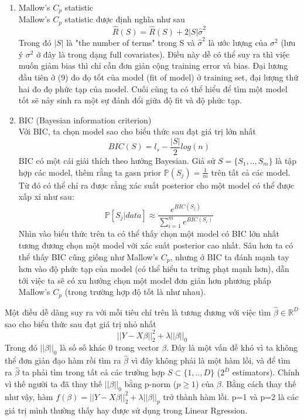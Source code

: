 \documentclass[10pt]{article}
\begin{document}
\begin{enumerate}
\item Mallow's $C_p$ statistic\\
Mallow's $C_p$ statistic được định nghĩa như sau 
\[\hat{R}(S) = \hat{R}(S) + 2|S|\hat{\sigma}^2 \tag{9} \]
Trong đó $|S|$ là "the number of terms" trong S và $\hat{\sigma}^2$ là ước lượng của $\sigma^2$ (lưu ý $\sigma^2$ ở đây là trong dạng full covariates). Điều này dễ có thể suy ra thì việc muốn giảm bias thì chỉ cần đơn giản cộng training error và bias. Đại lương đầu tiên ở (9) đo đọ tốt của model (fit of model) ở training set, đại lượng thứ hai đo đọ phức tạp của model. Cuối cùng ta có thể hiểu để tìm một model tốt sẽ nảy sinh ra một sự đánh đổi giữa độ fit và độ phức tạp.
\item BIC (Bayesian information criterion)\\
Với BIC, ta chọn model sao cho biểu thức sau đạt giá trị lớn nhất
\[BIC(S) = l_s -\frac{|S|}{2}log(n) \]
BIC có một cái giải thích theo hướng Bayesian. Giả sử $S = \{S_1,..,S_m \}$ là tập hợp các model, thêm rằng ta gasn prior $\mathbb{P}(S_j) = \frac{1}{m}$ trên tất cả các model. Từ đó có thể chỉ ra được rằng xác suất posterior cho một model có thể được xấp xỉ như sau:
\[ \mathbb{P}[S_j|data] \approx \frac{e^{BIC(S_j)}}{\sum_{i=1}^{m}e^{BIC(S_i)}}\] 
Nhìn vào biểu thức trên ta có thể thấy chọn một model có BIC lớn nhất tương đương chọn một model với xác suất posterior cao nhất. Sâu hơn ta có thể thấy BIC cũng giống như Mallow's $C_p$, nhưng ở BIC ta đánh mạnh tay hơn vào độ phức tạp của model (có thể hiểu ta trừng phạt mạnh hơn), dẫn tới việc ta sẽ có xu hướng chọn một model đơn giản hơn phương pháp Mallow's $C_p$ (trong trường hợp độ tốt là như nhau).
\end{enumerate}
Một điều dễ dàng suy ra với mỗi tiêu chí trên là tương đương với việc tìm $\hat{\beta} \in \mathbb{R}^{D}$ sao cho biểu thức sau đạt giá trị nhỏ nhất
\[ ||Y-X\beta||^2_2 + \lambda ||\beta||_0 \]
Trong đó $||\beta||_0$ là số số khác 0 trong vector $\beta$. Đây là một vấn đề khó vì ta không thể đơn giản đạo hàm rồi tìm ra $\hat{\beta}$ vì đây không phải là một hàm lồi, và để tìm ra  $\hat{\beta}$ ta phải tìm trong tất cả các trường hợp $S \subset \{1,..,D \}$ ($2^{D}$ estimators). Chính vì thế người ta đã thay thế $||\beta||_0$ bằng p-norm ($p \geq 1$) của $\beta$. Bằng cách thay thế như vậy, hàm $f(\beta) = ||Y-X\beta||^2_2 + \lambda ||\beta||_p$ trở thành hàm lồi. p=1 và p=2 là các giá trị mình thường thấy hay được sử dụng trong Linear Rgression.
\end{document}
